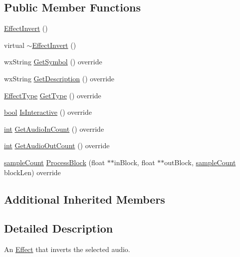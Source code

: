 \subsection*{Public Member Functions}
\begin{DoxyCompactItemize}
\item 
\hyperlink{class_effect_invert_a529f71236127f5deb7d40db6155a6a40}{Effect\+Invert} ()
\item 
virtual \hyperlink{class_effect_invert_aa693d55210b481ba6a4b9c5fa3b169a9}{$\sim$\+Effect\+Invert} ()
\item 
wx\+String \hyperlink{class_effect_invert_aba14fd48c5902fa09ff28b776c75c2b7}{Get\+Symbol} () override
\item 
wx\+String \hyperlink{class_effect_invert_abc8dc1545f4c2532ac45bb1ff9e9d800}{Get\+Description} () override
\item 
\hyperlink{_effect_interface_8h_a4809a7bb3fd1a421902a667cc1405d43}{Effect\+Type} \hyperlink{class_effect_invert_ac6d8565bd8db9291b6144bc15139c9e9}{Get\+Type} () override
\item 
\hyperlink{mac_2config_2i386_2lib-src_2libsoxr_2soxr-config_8h_abb452686968e48b67397da5f97445f5b}{bool} \hyperlink{class_effect_invert_a33a589c0338a915f5547e5512418f9ae}{Is\+Interactive} () override
\item 
\hyperlink{xmltok_8h_a5a0d4a5641ce434f1d23533f2b2e6653}{int} \hyperlink{class_effect_invert_ad28f9eeb37e431b74d01556b98d9719e}{Get\+Audio\+In\+Count} () override
\item 
\hyperlink{xmltok_8h_a5a0d4a5641ce434f1d23533f2b2e6653}{int} \hyperlink{class_effect_invert_a6159670ef7c73d1fc78183d075979556}{Get\+Audio\+Out\+Count} () override
\item 
\hyperlink{include_2audacity_2_types_8h_afa427e1f521ea5ec12d054e8bd4d0f71}{sample\+Count} \hyperlink{class_effect_invert_a8ef00713856f148d1dac5e58ed7523e0}{Process\+Block} (float $\ast$$\ast$in\+Block, float $\ast$$\ast$out\+Block, \hyperlink{include_2audacity_2_types_8h_afa427e1f521ea5ec12d054e8bd4d0f71}{sample\+Count} block\+Len) override
\end{DoxyCompactItemize}
\subsection*{Additional Inherited Members}


\subsection{Detailed Description}
An \hyperlink{class_effect}{Effect} that inverts the selected audio. 

